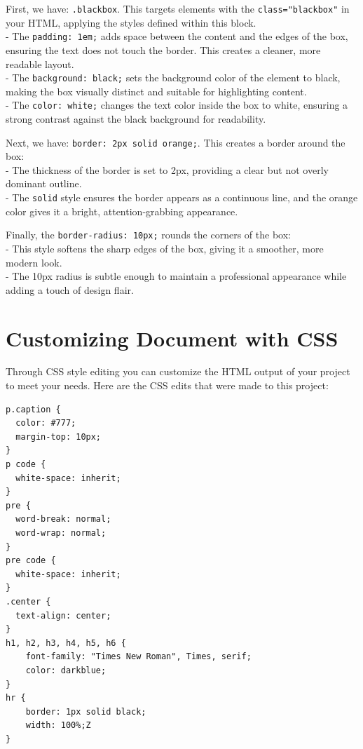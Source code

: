 \documentclass[
]{book}
\theoremstyle{definition}
\theoremstyle{definition}
\theoremstyle{definition}
\theoremstyle{definition}
\theoremstyle{remark}
\begin{document}
First, we have: \texttt{.blackbox}. This targets elements with the \texttt{class="blackbox"} in your HTML, applying the styles defined within this block.\\
- The \texttt{padding:\ 1em;} adds space between the content and the edges of the box, ensuring the text does not touch the border. This creates a cleaner, more readable layout.\\
- The \texttt{background:\ black;} sets the background color of the element to black, making the box visually distinct and suitable for highlighting content.\\
- The \texttt{color:\ white;} changes the text color inside the box to white, ensuring a strong contrast against the black background for readability.

Next, we have: \texttt{border:\ 2px\ solid\ orange;}. This creates a border around the box:\\
- The thickness of the border is set to 2px, providing a clear but not overly dominant outline.\\
- The \texttt{solid} style ensures the border appears as a continuous line, and the orange color gives it a bright, attention-grabbing appearance.

Finally, the \texttt{border-radius:\ 10px;} rounds the corners of the box:\\
- This style softens the sharp edges of the box, giving it a smoother, more modern look.\\
- The 10px radius is subtle enough to maintain a professional appearance while adding a touch of design flair.

\section{Customizing Document with CSS}\label{customizing-document-with-css}

Through CSS style editing you can customize the HTML output of your project to meet your needs. Here are the CSS edits that were made to this project:

\begin{verbatim}
p.caption {
  color: #777;
  margin-top: 10px;
}
p code {
  white-space: inherit;
}
pre {
  word-break: normal;
  word-wrap: normal;
}
pre code {
  white-space: inherit;
}
.center {
  text-align: center;
}
h1, h2, h3, h4, h5, h6 {
    font-family: "Times New Roman", Times, serif;
    color: darkblue;
}
hr {
    border: 1px solid black;
    width: 100%;Z
}
\end{verbatim}
\end{document}
